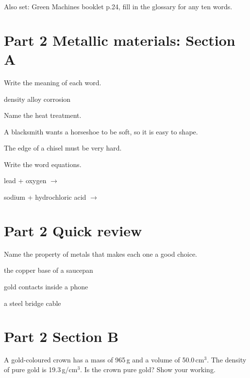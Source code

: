 \documentclass[11pt]{article}
\begin{document}
\vspace{4mm}
{\small Also set: Green Machines booklet p.24, fill in the glossary for any ten words.}

\clearpage
\section{Part 2 \textperiodcentered{} Metallic materials: Section A}
\Q Write the meaning of each word.
\par{} density
 alloy
 corrosion

\Q Name the heat treatment.
\par{} A blacksmith wants a horseshoe to be soft, so it is easy to shape. \hfill{}
\par{} The edge of a chisel must be very hard. \hfill{}\par\vspace{1mm}

\Q Write the word equations.
\par{} lead + oxygen $\longrightarrow$ 
\par{} sodium + hydrochloric acid $\longrightarrow$ \par\vspace{1mm}

\section{Part 2 \textperiodcentered{} Quick review}
\Q Name the property of metals that makes each one a good choice.
\par{} the copper base of a saucepan \hfill{}
\par{} gold contacts inside a phone \hfill{}
\par{} a steel bridge cable \hfill{}\par\vspace{1mm}

\section{Part 2 \textperiodcentered{} Section B}
\Q A gold-coloured crown has a mass of 965\,g and a volume of 50.0\,cm$^{3}$. The density of pure gold is 19.3\,g/cm$^{3}$. Is the crown pure gold? Show your working.
\end{document}
